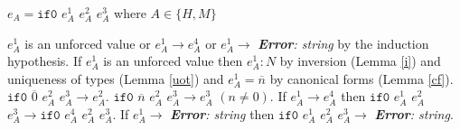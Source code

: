 \begin{case}

$e_{A}=\mathtt{if0}$ $e_{A}^{1}$ $e_{A}^{2}$ $e_{A}^{3}$ where $A\in\lbrace H,M\rbrace$

$e_{A}^{1}$ is an unforced value or $e_{A}^{1}\rightarrow e_{A}^{4}$ or $e_{A}^{1}\rightarrow$ \emph{\textbf{Error}: string} by the induction hypothesis.  If $e_{A}^{1}$ is an unforced value then $e_{A}^{1}:N$ by inversion (Lemma \ref{i}) and uniqueness of types (Lemma \ref{uot}) and $e_{A}^{1}=\overline{n}$ by canonical forms (Lemma \ref{cf}).  $\mathtt{if0}$ $\overline{0}$ $e_{A}^{2}$ $e_{A}^{3}\rightarrow e_{A}^{2}$.  $\mathtt{if0}$ $\overline{n}$ $e_{A}^{2}$ $e_{A}^{3}\rightarrow e_{A}^{3}$ $(n\neq 0)$.  If $e_{A}^{1}\rightarrow e_{A}^{4}$ then $\mathtt{if0}$ $e_{A}^{1}$ $e_{A}^{2}$ $e_{A}^{3}\rightarrow \mathtt{if0}$ $e_{A}^{4}$ $e_{A}^{2}$ $e_{A}^{3}$.  If $e_{A}^{1}\rightarrow$ \emph{\textbf{Error}: string} then $\mathtt{if0}$ $e_{A}^{1}$ $e_{A}^{2}$ $e_{A}^{3}\rightarrow$ \emph{\textbf{Error}: string}.

\end{case}